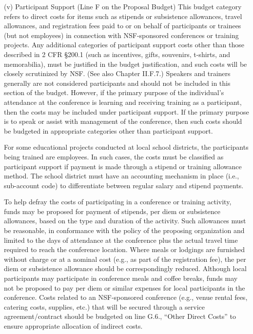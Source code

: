 {(v) Participant Support (Line F on the Proposal Budget)
This budget category refers to direct costs for items such as stipends or subsistence allowances, travel allowances, and registration fees paid to or on behalf of participants or trainees (but not employees) in connection with NSF-sponsored conferences or training projects. Any additional categories of participant support costs other than those described in 2 CFR §200.1 (such as incentives, gifts, souvenirs, t-shirts, and memorabilia), must be justified in the budget justification, and such costs will be closely scrutinized by NSF. (See also Chapter II.F.7.) Speakers and trainers generally are not considered participants and should not be included in this section of the budget. However, if the primary purpose of the individual’s attendance at the conference is learning and receiving training as a participant, then the costs may be included under participant support. If the primary purpose is to speak or assist with management of the conference, then such costs should be budgeted in appropriate categories other than participant support.

For some educational projects conducted at local school districts, the participants being trained are employees. In such cases, the costs must be classified as participant support if payment is made through a stipend or training allowance method. The school district must have an accounting mechanism in place (i.e., sub-account code) to differentiate between regular salary and stipend payments.

To help defray the costs of participating in a conference or training activity, funds may be proposed for payment of stipends, per diem or subsistence allowances, based on the type and duration of the activity. Such allowances must be reasonable, in conformance with the policy of the proposing organization and limited to the days of attendance at the conference plus the actual travel time required to reach the conference location. Where meals or lodgings are furnished without charge or at a nominal cost (e.g., as part of the registration fee), the per diem or subsistence allowance should be correspondingly reduced. Although local participants may participate in conference meals and coffee breaks, funds may not be proposed to pay per diem or similar expenses for local participants in the conference. Costs related to an NSF-sponsored conference (e.g., venue rental fees, catering costs, supplies, etc.) that will be secured through a service agreement/contract should be budgeted on line G.6., “Other Direct Costs” to ensure appropriate allocation of indirect costs.

}
